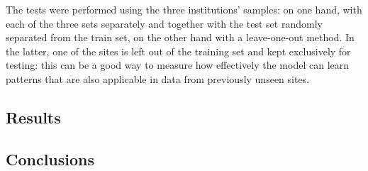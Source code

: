 	The tests were performed using the three institutions' samples: on one hand, with each of the three sets separately and together with the test set randomly separated from the train set, on the other hand with a leave-one-out method. In the latter, one of the sites is left out of the training set and kept exclusively for testing: this can be a good way to measure how effectively the model can learn patterns that are also applicable in data from previously unseen sites.
	
	\subsection{Results}
	
	
	
	\subsection{Conclusions}
	
	
	
